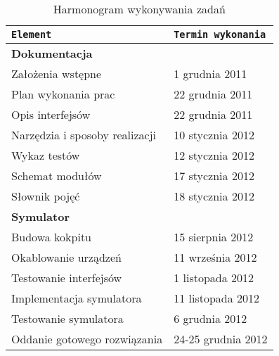 \documentclass[12pt,a4paper]{article}
\begin{document}
\begin{table}[h]
\caption{Harmonogram wykonywania zadań}
	\begin{center}
\begin{tabular}{l|l}
\texttt{Element} & \texttt{Termin wykonania} \\ \hline
{\bf Dokumentacja}\\
		Założenia wstępne & 1 grudnia 2011 \\
		Plan wykonania prac & 22 grudnia 2011 \\
		Opis interfejsów & 22 grudnia 2011 \\
		Narzędzia i sposoby realizacji & 10 stycznia 2012 \\
		Wykaz testów	&	12 stycznia 2012 \\
		Schemat modułów	&	17 stycznia 2012 \\
		Słownik pojęć & 18 stycznia 2012 \\ \hline
{\bf Symulator}\\ 
		Budowa kokpitu & 15 sierpnia 2012 \\
		Okablowanie urządzeń & 11 września 2012 \\
		Testowanie interfejsów & 1 listopada 2012 \\
		Implementacja symulatora & 11 listopada 2012 \\
		Testowanie symulatora & 6 grudnia 2012 \\
		Oddanie gotowego rozwiązania & 24-25 grudnia 2012 \\
\end{tabular}
\label{har}
\end{center}
\end{table}
\end{document}
